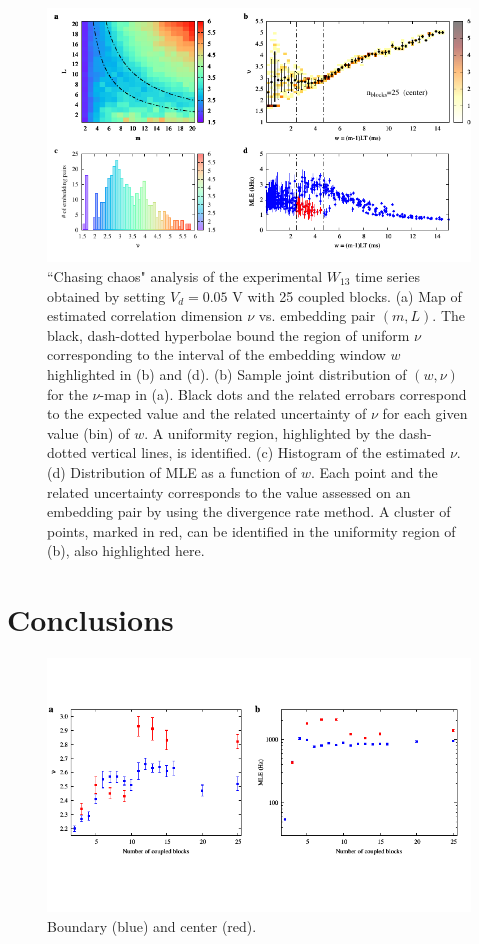\begin{figure}[H]
    \centering
    \includegraphics[width=\linewidth]{../blocks/25_blocks/middle/2e5_points/plots/chaos_low.pdf}
    \caption{``Chasing chaos" analysis of the experimental $W_{13}$ time series obtained by setting $V_d=0.05$ V with 25 coupled blocks.
    (a) Map of estimated correlation dimension $\nu$ vs. embedding pair $(m, L)$.
    The black, dash-dotted hyperbolae bound the region of uniform $\nu$ corresponding to the interval of the
    embedding window $w$ highlighted in (b) and (d).
    (b) Sample joint distribution of $(w,\nu)$ for the $\nu$-map in (a).
    Black dots and the related errobars correspond to the expected value and the related uncertainty of $\nu$
    for each given value (bin) of $w$. A uniformity region, highlighted by the dash-dotted vertical lines,
    is identified. (c) Histogram of the estimated $\nu$. (d) Distribution of MLE as a function of $w$. Each point and the related
    uncertainty corresponds to the value assessed on an embedding pair by using the divergence rate method.
    A cluster of points, marked in red, can be identified in the uniformity region of (b), also highlighted here.}
    \label{fig:25 blocks chaos middle}
\end{figure}


\section{Conclusions}

\begin{figure}[H]
    \centering
    \includegraphics[width=\linewidth,trim={0 1.5cm 0 1.3cm},clip]
    {../blocks/data/nu_mle_blocks.pdf}
    \caption{Boundary (blue) and center (red).}
    \label{fig:nu mle blocks}
\end{figure}
